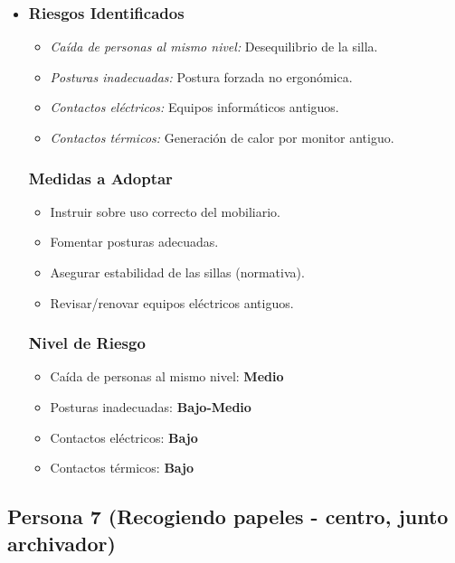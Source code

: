 \documentclass[12pt,a4paper]{article}
\begin{document}
	\begin{itemize}
		\item \subsubsection{Riesgos Identificados}
		\begin{itemize}
			\item \textit{Caída de personas al mismo nivel:} Desequilibrio de la silla.
			\item \textit{Posturas inadecuadas:} Postura forzada no ergonómica.
			\item \textit{Contactos eléctricos:} Equipos informáticos antiguos.
			\item \textit{Contactos térmicos:} Generación de calor por monitor antiguo.
		\end{itemize}
		\subsubsection{Medidas a Adoptar}
		\begin{itemize}
			\item Instruir sobre uso correcto del mobiliario.
			\item Fomentar posturas adecuadas.
			\item Asegurar estabilidad de las sillas (normativa).
			\item Revisar/renovar equipos eléctricos antiguos.
		\end{itemize}
		\subsubsection{Nivel de Riesgo}
		\begin{itemize}
			\item Caída de personas al mismo nivel: \textbf{Medio}
			\item Posturas inadecuadas: \textbf{Bajo-Medio}
			\item Contactos eléctricos: \textbf{Bajo}
			\item Contactos térmicos: \textbf{Bajo}
		\end{itemize}
	\end{itemize}
	
	\hrulefill
	
	\subsection{Persona 7 (Recogiendo papeles - centro, junto archivador)}
	\label{subsec:persona7} %
	
\end{document}
